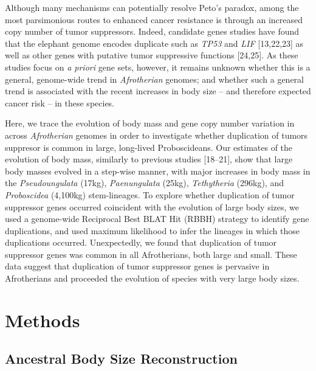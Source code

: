 \documentclass[]{elsarticle} %
\begin{document}
Although many mechanisms can potentially resolve Peto's paradox, among the most parsimonious routes to enhanced cancer resistance is through an increased copy number of tumor suppressors. Indeed, candidate genes studies have found that the elephant genome encodes duplicate such as \emph{TP53} and \emph{LIF} {[}13,22,23{]} as well as other genes with putative tumor suppressive functions {[}24,25{]}. As these studies focus on \emph{a priori} gene sets, however, it remains unknown whether this is a general, genome-wide trend in \emph{Afrotherian} genomes; and whether such a general trend is associated with the recent increases in body size -- and therefore expected cancer risk -- in these species.

Here, we trace the evolution of body mass and gene copy number variation in across \emph{Afrotherian} genomes in order to investigate whether duplication of tumors suppresor is common in large, long-lived Proboscideans. Our estimates of the evolution of body mass, similarly to previous studies {[}18--21{]}, show that large body masses evolved in a step-wise manner, with major increases in body mass in the \emph{Pseudoungulata} (17kg), \emph{Paenungulata} (25kg), \emph{Tethytheria} (296kg), and \emph{Proboscidea} (4,100kg) stem-lineages. To explore whether duplication of tumor suppressor genes occurred coincident with the evolution of large body sizes, we used a genome-wide Reciprocal Best BLAT Hit (RBBH) strategy to identify gene duplications, and used maximum likelihood to infer the lineages in which those duplications occurred. Unexpectedly, we found that duplication of tumor suppressor genes was common in all Afrotherians, both large and small. These data suggest that duplication of tumor suppressor genes is pervasive in Afrotherians and proceeded the evolution of species with very large body sizes.

\hypertarget{methods}{%
\section{Methods}\label{methods}}

\hypertarget{ancestral-body-size-reconstruction}{%
\subsection{Ancestral Body Size Reconstruction}\label{ancestral-body-size-reconstruction}}
\end{document}
